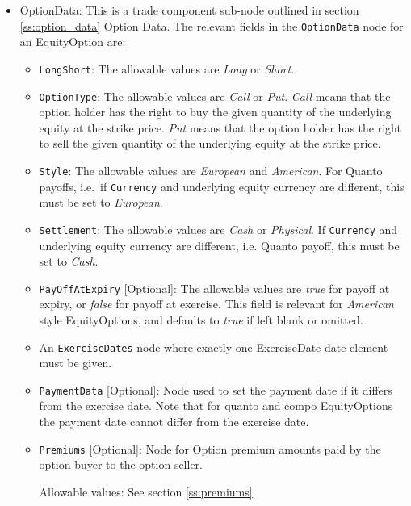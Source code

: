 \begin{itemize}
	\item OptionData: This is a trade component sub-node outlined in section \ref{ss:option_data} Option Data. The relevant fields in the \lstinline!OptionData! node for an EquityOption are:

	
	\begin{itemize}
	\item \lstinline!LongShort!: The allowable values are \emph{Long} or \emph{Short}.

	\item \lstinline!OptionType!: The allowable values are \emph{Call} or \emph{Put}.  \emph{Call} means that the option holder has the right to buy the given quantity of the underlying equity at the strike price.  \emph{Put} means that the option holder has the right to sell the given quantity of the underlying equity at the strike price. 
	
\item  \lstinline!Style!: The allowable values are \emph{European} and \emph{American}. For Quanto payoffs, i.e.\ if \lstinline!Currency! and underlying equity currency are different, this must be set to \emph{European}.

\item  \lstinline!Settlement!: The allowable values are \emph{Cash} or \emph{Physical}. If
\lstinline!Currency! and underlying equity currency are different, i.e. Quanto payoff, this
must be set to \emph{Cash}.

\item \lstinline!PayOffAtExpiry! [Optional]: The allowable values are \emph{true} for payoff at expiry, or \emph{false} for payoff at exercise. This field is relevant for \emph{American} style EquityOptions, and defaults to \emph{true} if left blank or omitted. 

\item An \lstinline!ExerciseDates! node where exactly one ExerciseDate date element must be given. 

\item \lstinline!PaymentData! [Optional]: Node used to set the payment date if it differs from the exercise date. Note that for quanto and compo EquityOptions the payment date cannot differ from the exercise date.

\item \lstinline!Premiums! [Optional]: Node for Option premium amounts paid by the option buyer to the option seller.

Allowable values:  See section \ref{ss:premiums}


\end{itemize}
\end{itemize}
